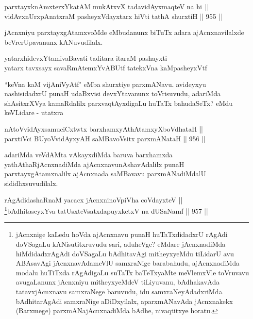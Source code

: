 \begin{shl}
parxtayxknAmxterxYkatAM mukAtxvX tadavidAyxmaqteV na hi || \\
vidAvxnUrxpAnatxraM pasheyxVdayxtarx hiVti tathA shurxtiH \hfill || 955 ||  
\end{shl}

\begin{artha}
jAcnxniyu parxtayxgAtamxvoMde eMbudanunx biTuTx adara ajAcnxnavilalxde beVrerUpavanunx kANuvudilalx.
\end{artha}
	
\begin{shl}
yatarxhidevxYtamivaBavati taditara itaraM pashayxti \\
yatarx tavxsayx savaRmAtemxYvABUtf tatekxVna kaMpasheyxVtf
\end{shl}	
	
\begin{artha}
``keVna kaM vijAniVyAtf" eMba shurxtiye parxmANavu. avideyxyu nashisidadxrU punaH udaBxvisi devxYtavanunx toVrisuvudu, adariMda shAsitxrXVya kamaRdalilx parxvaqtAyxdigaLu huTaTx bahudaSeTx? eMdu keVLidare - utatxra
\end{artha}

\begin{shl}
nAtoV\s vidAyxsamuciCxtwtx barxhamxyAthAtamxyXboVdhataH || \\
parxtiVci BUyoV\s vidAyxyAH saMBavoV\s sitx parxmANataH \hfill || 956 ||  
\end{shl}

\begin{artha}
adariMda veVdAMta vAkayxdiMda baruva barxhamxda yathAthaRjAcnxnadiMda ajAcnxnavunAshavAdalilx punaH parxtayxgAtamxnalilx ajAcnxnada saMBavavu parxmANadiMdalU sididhxsuvudilalx.
\end{artha}


\begin{shl}
rAgAdidashaRnaM yacacx jAcnxninoV\s piVha coVdayxteV || \\
\footnote{jAcnxnige kaLedu hoVda ajAcnxnavu punaH huTaTxdidadxrU rAgAdi doVSagaLu kANisutitxruvudu sari, aduheVge? eMdare jAcnxnadiMda hiMdidadxrAgAdi doVSagaLu bAdhitavAgi mitheyxyeMdu tiLidarU avu ABAsavAgi jAcnxnavAdameVlU samxraNige barabahudu, ajAcnxnadiMda modalu huTiTxda rAgAdigaLu suTaTx baTeTxyaMte meVlemxVle toVruvavu avugaLanunx jAcnxniyu mitheyxyeMdeV tiLiyuvanu, bAdhakavAda tatavxjAcnxnavu samxraNege baruvudu, idu samxraNeyAdadxriMda bAdhitarAgAdi samxraNige aDiDxyilalx, aparxmANavAda jAcnxnakekx (Barxmege) parxmANajAcnxnadiMda bAdhe, nivaqtitxye horatu.}bAdhitaseyxYva tatUsxteVsatxdapuyxketxV na dUSaNamf \hfill || 957 ||  
\end{shl}


